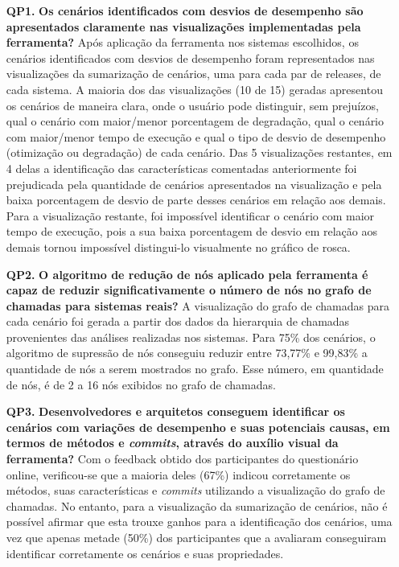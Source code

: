 \begin{itemize}
  \item[\textbf{QP1.}] \textbf{Os cenários identificados com desvios de desempenho são apresentados claramente nas visualizações implementadas pela ferramenta?} Após aplicação da ferramenta nos sistemas escolhidos, os cenários identificados com desvios de desempenho foram representados nas visualizações da sumarização de cenários, uma para cada par de releases, de cada sistema. A maioria dos das visualizações (10 de 15) geradas apresentou os cenários de maneira clara, onde o usuário pode distinguir, sem prejuízos, qual o cenário com maior/menor porcentagem de degradação, qual o cenário com maior/menor tempo de execução e qual o tipo de desvio de desempenho (otimização ou degradação) de cada cenário. Das 5 visualizações restantes, em 4 delas a identificação das características comentadas anteriormente foi prejudicada pela quantidade de cenários apresentados na visualização e pela baixa porcentagem de desvio de parte desses cenários em relação aos demais. Para a visualização restante, foi impossível identificar o cenário com maior tempo de execução, pois a sua baixa porcentagem de desvio em relação aos demais tornou impossível distingui-lo visualmente no gráfico de rosca.
  \item[\textbf{QP2.}] \textbf{O algoritmo de redução de nós aplicado pela ferramenta é capaz de reduzir significativamente o número de nós no grafo de chamadas para sistemas reais?} A visualização do grafo de chamadas para cada cenário foi gerada a partir dos dados da hierarquia de chamadas provenientes das análises realizadas nos sistemas. Para 75\% dos cenários, o algoritmo de supressão de nós conseguiu reduzir entre 73,77\% e 99,83\% a quantidade de nós a serem mostrados no grafo. Esse número, em quantidade de nós, é de 2 a 16 nós exibidos no grafo de chamadas.
  \item[\textbf{QP3.}] \textbf{Desenvolvedores e arquitetos conseguem identificar os cenários com variações de desempenho e suas potenciais causas, em termos de métodos e \textit{commits}, através do auxílio visual da ferramenta?} Com o feedback obtido dos participantes do questionário online, verificou-se que a maioria deles (67\%) indicou corretamente os métodos, suas características e \textit{commits} utilizando a visualização do grafo de chamadas. No entanto, para a visualização da sumarização de cenários, não é possível afirmar que esta trouxe ganhos para a identificação dos cenários, uma vez que apenas metade (50\%) dos participantes que a avaliaram conseguiram identificar corretamente os cenários e suas propriedades.

\end{itemize}
